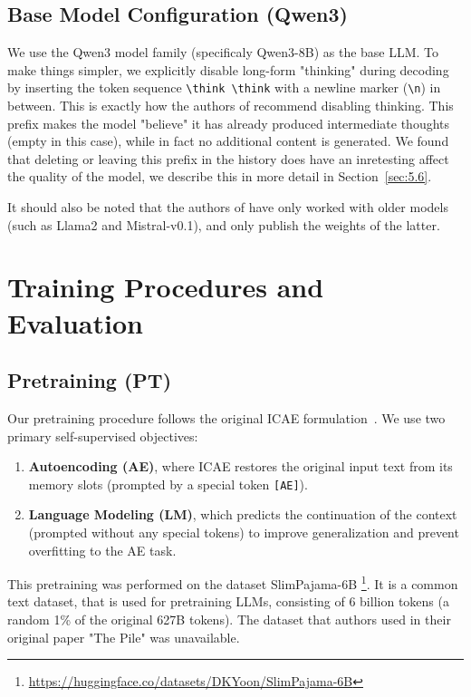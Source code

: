 \subsection{Base Model Configuration (Qwen3)}
We use the Qwen3 model family (specificaly Qwen3-8B) as the base LLM. 
To make things simpler, we explicitly disable long-form "thinking" during decoding by inserting the token sequence \texttt{\textbackslash think \textbackslash think} with a newline marker (\texttt{\textbackslash n}) in between.
This is exactly how the authors of \cite{qwen3} recommend disabling thinking.
This prefix makes the model "believe" it has already produced intermediate thoughts (empty in this case), while in fact no additional content is generated.
We found that deleting or leaving this prefix in the history does have an inretesting affect the quality of the model, we describe this in more detail in Section~\ref{sec:5.6}.

It should also be noted that the authors of \cite{ge_context_2024} have only worked with older models (such as Llama2 and Mistral-v0.1), and only publish the weights of the latter.


\section{Training Procedures and Evaluation}

\subsection{Pretraining (PT)}
Our pretraining procedure follows the original ICAE formulation~\cite{ge_-context_2024}.
We use two primary self-supervised objectives:
\begin{enumerate}[label=(\roman*)]
    \item \textbf{Autoencoding (AE)}, where ICAE restores the original input text from its memory slots (prompted by a special token \texttt{[AE]}).
    \item \textbf{Language Modeling (LM)}, which predicts the continuation of the context (prompted without any special tokens) to improve generalization and prevent overfitting to the AE task.
\end{enumerate}
This pretraining was performed on the dataset SlimPajama-6B \cite{pajama6b}\footnote{\url{https://huggingface.co/datasets/DKYoon/SlimPajama-6B}}.
It is a common text dataset, that is used for pretraining LLMs, consisting of 6 billion tokens (a random 1\% of the original 627B tokens).
The dataset that authors used in their original paper "The Pile" was unavailable.

